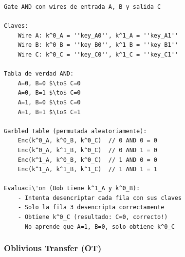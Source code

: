 \documentclass[11pt,a4paper,twoside]{book}
\begin{document}
\begin{example}
\begin{verbatim}
Gate AND con wires de entrada A, B y salida C

Claves:
    Wire A: k^0_A = ''key_A0'', k^1_A = ''key_A1''
    Wire B: k^0_B = ''key_B0'', k^1_B = ''key_B1''
    Wire C: k^0_C = ''key_C0'', k^1_C = ''key_C1''

Tabla de verdad AND:
    A=0, B=0 $\to$ C=0
    A=0, B=1 $\to$ C=0
    A=1, B=0 $\to$ C=0
    A=1, B=1 $\to$ C=1

Garbled Table (permutada aleatoriamente):
    Enc(k^0_A, k^0_B, k^0_C)  // 0 AND 0 = 0
    Enc(k^0_A, k^1_B, k^0_C)  // 0 AND 1 = 0
    Enc(k^1_A, k^0_B, k^0_C)  // 1 AND 0 = 0
    Enc(k^1_A, k^1_B, k^1_C)  // 1 AND 1 = 1

Evaluaci\'on (Bob tiene k^1_A y k^0_B):
    - Intenta desencriptar cada fila con sus claves
    - Solo la fila 3 desencripta correctamente
    - Obtiene k^0_C (resultado: C=0, correcto!)
    - No aprende que A=1, B=0, solo obtiene k^0_C
\end{verbatim}
\end{example}

\subsubsection{Oblivious Transfer (OT)}
\end{document}
